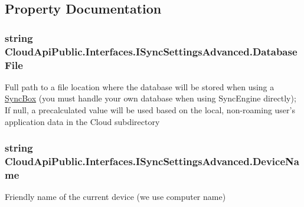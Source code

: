 \subsection{Property Documentation}
\hypertarget{interface_cloud_api_public_1_1_interfaces_1_1_i_sync_settings_advanced_a16054154b37da7455f410a3b8f074a27}{
\subsubsection[{Database\-File}]{\setlength{\rightskip}{0pt plus 5cm}string Cloud\-Api\-Public.\-Interfaces.\-I\-Sync\-Settings\-Advanced.\-Database\-File\hspace{0.3cm}{\ttfamily [get]}}}\label{interface_cloud_api_public_1_1_interfaces_1_1_i_sync_settings_advanced_a16054154b37da7455f410a3b8f074a27}


Full path to a file location where the database will be stored when using a \hyperlink{class_cloud_api_public_1_1_sync_box}{Sync\-Box} (you must handle your own database when using Sync\-Engine directly); If null, a precalculated value will be used based on the local, non-\/roaming user's application data in the Cloud subdirectory 

\hypertarget{interface_cloud_api_public_1_1_interfaces_1_1_i_sync_settings_advanced_a6c77d27d7e668673e0739f84d500e5f4}{
\subsubsection[{Device\-Name}]{\setlength{\rightskip}{0pt plus 5cm}string Cloud\-Api\-Public.\-Interfaces.\-I\-Sync\-Settings\-Advanced.\-Device\-Name\hspace{0.3cm}{\ttfamily [get]}}}\label{interface_cloud_api_public_1_1_interfaces_1_1_i_sync_settings_advanced_a6c77d27d7e668673e0739f84d500e5f4}


Friendly name of the current device (we use computer name) 

